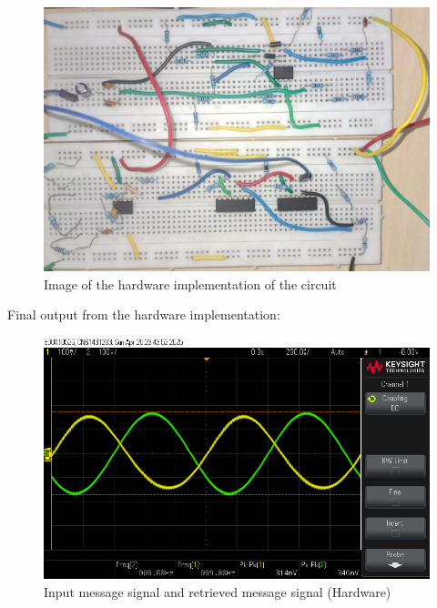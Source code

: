 \documentclass[conference]{IEEEtran}
\begin{document}
\begin{figure}
    \centering
    \includegraphics[width=1\linewidth]{Images/Full_circuit_hardware.png}
    \caption{Image of the hardware implementation of the circuit}
\end{figure}

Final output from the hardware implementation:
\begin{figure}
    \centering
    \includegraphics[width=1\linewidth]{Images/final_out_circuit.png}
    \caption{Input message signal and retrieved message signal (Hardware)}
\end{figure}
\end{document}
